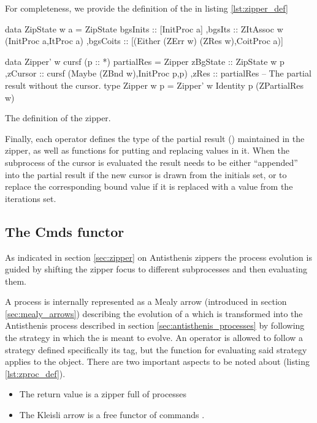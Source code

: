 For completeness, we provide the definition of the  in
listing \ref{lst:zipper_def}

\begin{code}
\begin{haskellcode}
 data ZipState w a =
  ZipState
  { bgsInits :: [InitProc a]
   ,bgsIts :: ZItAssoc w (InitProc a,ItProc a)
   ,bgsCoits :: [(Either (ZErr w) (ZRes w),CoitProc a)]
  }

data Zipper' w cursf (p :: *) partialRes =
  Zipper
  { zBgState :: ZipState w p
   ,zCursor  :: cursf (Maybe (ZBnd w),InitProc p,p)
   ,zRes     :: partialRes -- The partial result without the cursor.
  }
type Zipper w p = Zipper' w Identity p (ZPartialRes w)
\end{haskellcode}
  \caption{\label{lst:zipper_def}The definition of the zipper.}
\end{code}

Finally, each operator defines the type of the partial result ()
maintained in the zipper, as well as functions for putting and replacing values in
it. When the subprocess of the cursor is evaluated the result needs to
be either ``appended'' into the partial result if the new cursor is
drawn from the initials set, or to replace the corresponding bound
value if it is replaced with a value from the iterations set.

\subsection{The Cmds functor}
\label{sec:cmds_functor}

As indicated in section \ref{sec:zipper} on Antisthenis zippers
the process evolution is guided
by shifting the zipper focus to different subprocesses and then
evaluating them.

A process is internally represented as a Mealy arrow (introduced in
section \ref{sec:mealy_arrows}) describing the evolution of a
 which is transformed into the Antisthenis process
described in section \ref{sec:antisthenis_processes} by following the
strategy in which the  is meant to evolve. An operator is
allowed to follow a strategy defined specifically its
 tag, but the function for evaluating said strategy
applies to the  object. There are two important aspects to
be noted about  (listing \ref{lst:zproc_def}).

\begin{itemize}
\item The return value is a zipper full of processes 
\item The Kleisli arrow is a free functor of commands .
\end{itemize}

